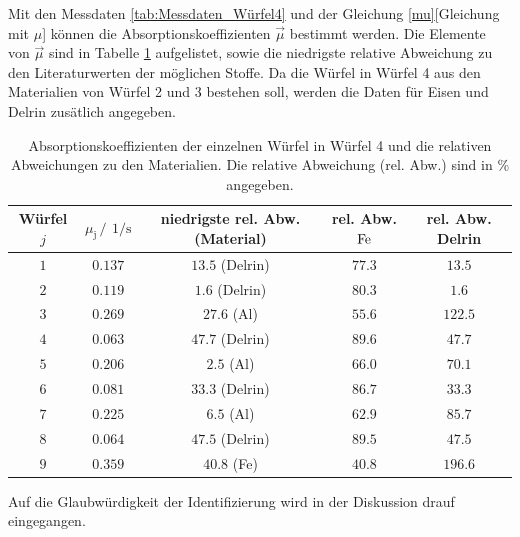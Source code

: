 \FloatBarrier
Mit den Messdaten \ref{tab:Messdaten_Würfel4} und der Gleichung \ref{mu}[Gleichung mit $\mu$] können die 
Absorptionskoeffizienten $\vec{\mu}$ bestimmt werden. Die Elemente von $\vec{\mu}$ sind in Tabelle \ref{tab:Würfel4_mu} 
aufgelistet, sowie die niedrigste relative Abweichung zu den Literaturwerten der möglichen Stoffe. Da die 
Würfel in Würfel 4 aus den Materialien von Würfel 2 und 3 bestehen soll, werden die Daten für Eisen und Delrin zusätlich angegeben.
\FloatBarrier
\begin{table}
    \centering
    \caption{Absorptionskoeffizienten der einzelnen Würfel in Würfel 4 und die relativen Abweichungen zu den Materialien. Die relative Abweichung (rel. Abw.) sind in \% angegeben.}
    \label{tab:Würfel4_mu}
    \begin{tabular}{c c c c c}
        \toprule
        Würfel $j$&$\mu_{\text{j}} \,/\,\SI{}{1\per\second}$&niedrigste rel. Abw. (Material)& rel. Abw. $\ce{Fe}$&rel. Abw. Delrin\\
        \midrule
        $\num{1}$ &$\num{0.137}$&$\num{13.5}$ (Delrin)&$\num{77.3}$&$\num{13.5}$\\
        $\num{2}$ &$\num{0.119}$&$\num{1.6}$ (Delrin)&$\num{80.3}$&$\num{1.6}$\\
        $\num{3}$ &$\num{0.269}$&$\num{27.6}$ (Al)&$\num{55.6}$&$\num{122.5}$\\
        $\num{4}$ &$\num{0.063}$&$\num{47.7}$ (Delrin)&$\num{89.6}$&$\num{47.7}$\\
        $\num{5}$ &$\num{0.206}$&$\num{2.5}$ (Al)&$\num{66.0}$&$\num{70.1}$\\
        $\num{6}$ &$\num{0.081}$&$\num{33.3}$ (Delrin)&$\num{86.7}$&$\num{33.3}$\\
        $\num{7}$ &$\num{0.225}$&$\num{6.5}$ (Al)&$\num{62.9}$&$\num{85.7}$\\
        $\num{8}$ &$\num{0.064}$&$\num{47.5}$ (Delrin)&$\num{89.5}$&$\num{47.5}$\\
        $\num{9}$ &$\num{0.359}$&$\num{40.8}$ (Fe)&$\num{40.8}$&$\num{196.6}$\\
        \bottomrule
    \end{tabular}
\end{table}
\FloatBarrier
Auf die Glaubwürdigkeit der Identifizierung wird in der Diskussion drauf eingegangen.